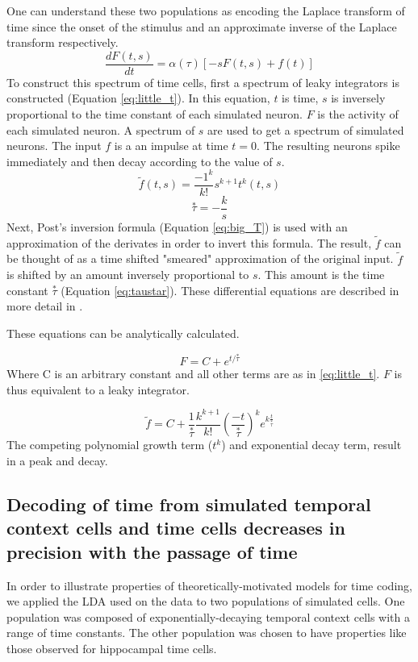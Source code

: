\documentclass{apa}
\newcommand{\taustar}{\ensuremath{\overset{*}{\tau}}}
\begin{document}
One can understand these two populations as encoding the Laplace transform of
time since the onset of the stimulus and an approximate inverse of the Laplace transform
respectively.   
\begin{equation}
\frac{dF(t,s)}{dt}=\alpha(\tau)\left[-sF(t,s)+f(t)\right]
\label{eq:little_t}
\end{equation}
To construct this spectrum of time cells, first a spectrum of leaky integrators is constructed (Equation \eqref{eq:little_t}).  In this equation, $t$ is time, $s$ is inversely proportional to the time constant of each simulated neuron. $F$ is the activity of each simulated neuron.
A spectrum of $s$ are used to get a spectrum of simulated neurons. The input $f$ is a an impulse at time $t=0$.  The resulting neurons spike immediately and then decay according to the value of $s$.
\begin{equation}
\tilde{f}(t,s)=\frac{-1^k}{k!}s^{k+1}t^k(t,s)
\label{eq:big_T}
\end{equation}
\begin{equation}
\taustar=-\frac{k}{s}
\label{eq:taustar}
\end{equation}
Next, Post's inversion formula (Equation \eqref{eq:big_T}) 
is used with an approximation of the derivates in order to invert this formula.  
The result, $\tilde{f}$ can be thought of as a time shifted "smeared" approximation of the original input.
$\tilde{f}$ is shifted by an amount inversely proportional to $s$.  This amount is the time constant $\taustar$ (Equation \eqref{eq:taustar}). These differential equations are described in more detail in \cite{ShanHowa12}.

These equations can be analytically calculated.

\begin{equation}
F=C+e^{t/\taustar}
\label{eq:_little_t_anal}
\end{equation}
Where C is an arbitrary constant and all other terms are as in \eqref{eq:little_t}. $F$ is thus equivalent to a leaky integrator.

\begin{equation}
\tilde{f}=C+\frac{1}{\taustar}\frac{k^{k+1}}{k!}(\frac{-t}{\taustar})^k e^{k\frac{t}{\taustar}}
\label{eq:big_T_anal}
\end{equation}
The competing polynomial growth term ($t^k$) and exponential decay term, result in a peak and decay.

\subsection{Decoding of time from simulated temporal context
cells and time cells decreases in precision with the passage of time}
In order to illustrate properties of theoretically-motivated models for time
coding, we applied the LDA used on the data to two populations of simulated
cells.  One population was composed of exponentially-decaying temporal context
cells with a range of time constants.    The other population was chosen to
have properties like those observed for hippocampal time cells.  
\end{document}
